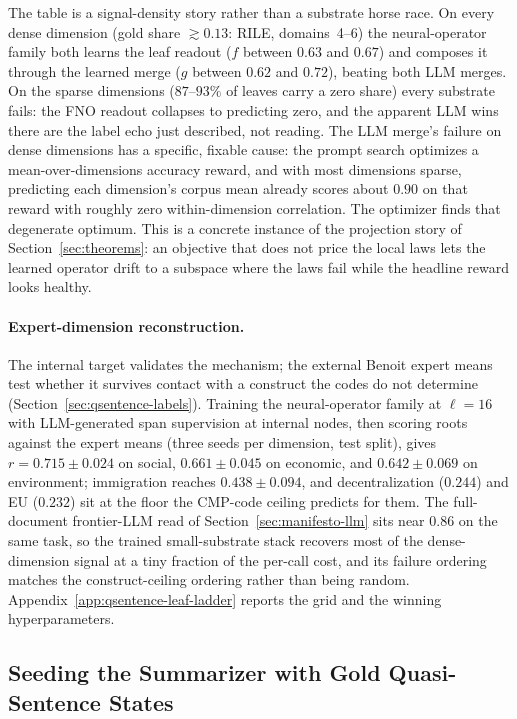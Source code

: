 The table is a signal-density story rather than a substrate horse race.
On every dense dimension (gold share $\gtrsim 0.13$: RILE,
domains~4--6) the neural-operator family both learns the leaf readout
($f$ between $0.63$ and $0.67$) and composes it through the learned
merge ($g$ between $0.62$ and $0.72$), beating both LLM merges. On the
sparse dimensions ($87$--$93\%$ of leaves carry a zero share) every
substrate fails: the FNO readout collapses to predicting zero, and the
apparent LLM wins there are the label echo just described, not reading.
The LLM merge's failure on dense dimensions has a specific, fixable
cause: the prompt search optimizes a mean-over-dimensions accuracy
reward, and with most dimensions sparse, predicting each dimension's
corpus mean already scores about $0.90$ on that reward with roughly
zero within-dimension correlation. The optimizer finds that degenerate
optimum. This is a concrete instance of the projection story of
Section~\ref{sec:theorems}: an objective that does not price the local
laws lets the learned operator drift to a subspace where the laws fail
while the headline reward looks healthy.

\paragraph{Expert-dimension reconstruction.} The internal target
validates the mechanism; the external Benoit expert means test whether
it survives contact with a construct the codes do not determine
(Section~\ref{sec:qsentence-labels}). Training the neural-operator
family at $\ell = 16$ with LLM-generated span supervision at internal
nodes, then scoring roots against the expert means (three seeds per
dimension, test split), gives $r = 0.715 \pm 0.024$ on social,
$0.661 \pm 0.045$ on economic, and $0.642 \pm 0.069$ on environment;
immigration reaches $0.438 \pm 0.094$, and decentralization ($0.244$)
and EU ($0.232$) sit at the floor the CMP-code ceiling predicts for
them. The full-document frontier-LLM read of
Section~\ref{sec:manifesto-llm} sits near $0.86$ on the same task, so
the trained small-substrate stack recovers most of the dense-dimension
signal at a tiny fraction of the per-call cost, and its failure
ordering matches the construct-ceiling ordering rather than being
random. Appendix~\ref{app:qsentence-leaf-ladder} reports the grid and
the winning hyperparameters.

\subsection{Seeding the Summarizer with Gold Quasi-Sentence States}\label{sec:gold-seeding}

